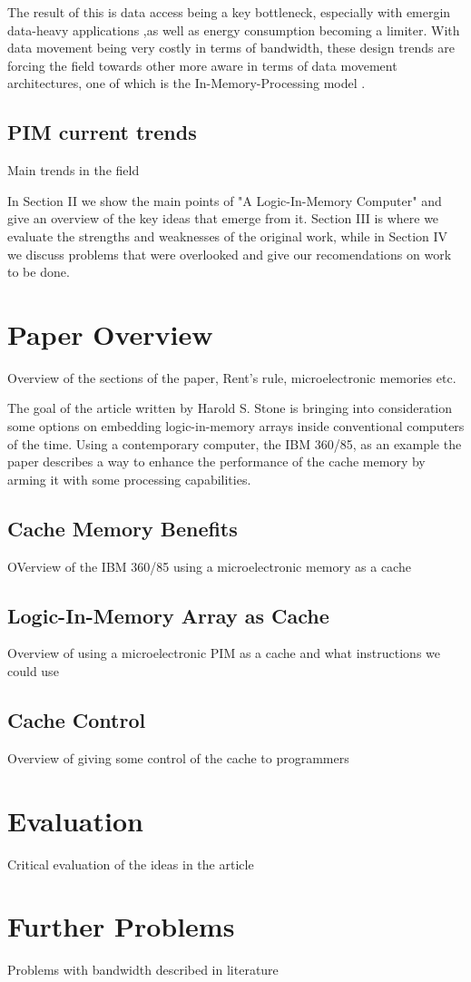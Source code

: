 \documentclass[12pt,twocolumn]{IEEEtran}
\begin{document}
The result of this is data access being a key bottleneck, especially with emergin data-heavy applications ,as well as energy consumption becoming a limiter. With data movement being very costly in terms of bandwidth, these design trends are forcing the field towards other more aware in terms of data movement architectures, one of which is the In-Memory-Processing model \cite{PAPER:1}.

\subsection{PIM current trends}
Main trends in the field

In Section II we show the main points of "A Logic-In-Memory Computer" and give an overview of the key ideas that emerge from it. Section III is where we evaluate the strengths and weaknesses of the original work, while in Section IV we discuss problems that were overlooked and give our recomendations on work to be done.


\section{Paper Overview}
Overview of the sections of the paper, Rent's rule, microelectronic memories etc.

 The goal of the article written by Harold S. Stone is bringing into consideration some options on embedding logic-in-memory arrays inside conventional computers of the time. Using a contemporary computer, the IBM 360/85, as an example the paper describes a way to enhance the performance of the cache memory by arming it with some processing capabilities. 
\subsection{Cache Memory Benefits}
OVerview of the IBM 360/85 using a microelectronic memory as a cache
\subsection{Logic-In-Memory Array as Cache}
Overview of using a microelectronic PIM as a cache and what instructions we could use
\subsection{Cache Control}
Overview of giving some control of the cache to programmers
\section{Evaluation}
Critical evaluation of the ideas in the article
\section{Further Problems}
Problems with bandwidth described in literature



\end{document}
